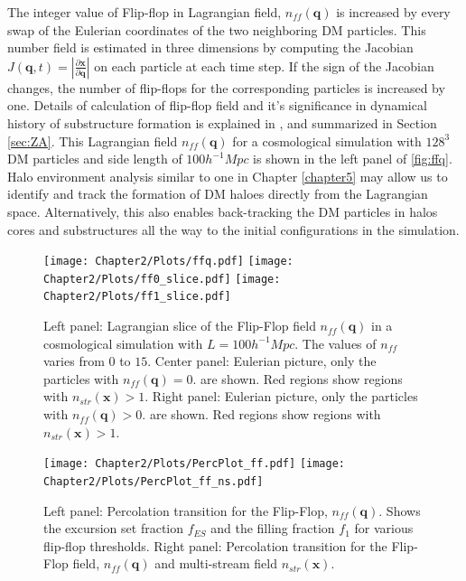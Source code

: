 The integer value of Flip-flop in Lagrangian field, $n_{ff}(\mathbf{q})$ is increased by every swap of the Eulerian coordinates of the two neighboring DM particles. This number field is estimated in three dimensions by computing the Jacobian  $J(\mathbf{q}, t) = |\frac{\partial\mathbf{x}}{\partial\mathbf{q}}|$  on each particle at each time step. If the sign of the Jacobian changes, the number of flip-flops for the corresponding particles is increased by one. Details of calculation of flip-flop field and it's significance in dynamical history of substructure formation is explained in \citep{Shandarin2016}, and summarized in Section \ref{sec:ZA}. This Lagrangian field $n_{ff}(\mathbf{q})$ for a cosmological simulation with $128^3$ DM particles and side length of $100 h^{-1} Mpc$ is shown in the left panel of \autoref{fig:ffq}. Halo environment analysis similar to one in Chapter \ref{chapter5} may allow us to identify and track the formation of DM haloes directly from the Lagrangian space. Alternatively, this also enables back-tracking the DM particles in halos cores and substructures all the way to the initial configurations in the simulation.  

\begin{figure}
\begin{minipage}[t]{.99\linewidth}
 \centering\texttt{[image: Chapter2/Plots/ffq.pdf]} 
\centering\texttt{[image: Chapter2/Plots/ff0\_slice.pdf]} 
 \centering\texttt{[image: Chapter2/Plots/ff1\_slice.pdf]} 
\end{minipage}\hfill
\caption{Left panel: Lagrangian slice of the Flip-Flop field $n_{ff}(\mathbf{q})$ in a cosmological simulation with $L = 100 h^{-1} Mpc$. The values of $n_{ff}$ varies from $0$ to $15$. Center panel: Eulerian picture, only the particles with $n_{ff}(\mathbf{q}) = 0$. are shown. Red regions show regions with $n_{str}(\mathbf{x}) > 1$. Right panel: Eulerian picture, only the particles with $n_{ff}(\mathbf{q}) > 0$. are shown. Red regions show regions with $n_{str}(\mathbf{x}) > 1$.}
\label{fig:ffq}
\end{figure}


\begin{figure}
\begin{minipage}[t]{.99\linewidth}
 \centering\texttt{[image: Chapter2/Plots/PercPlot\_ff.pdf]} 
  \centering\texttt{[image: Chapter2/Plots/PercPlot\_ff\_ns.pdf]}  
\end{minipage}\hfill
\caption{Left panel: Percolation transition for the Flip-Flop, $n_{ff}(\mathbf{q})$. Shows the excursion set fraction $f_{ES}$ and the filling fraction $f_1$ for various flip-flop thresholds. Right panel: Percolation transition for the Flip-Flop field, $n_{ff}(\mathbf{q})$ and multi-stream field $n_{str}(\mathbf{x})$.}
\label{fig:percplot}
\end{figure}



